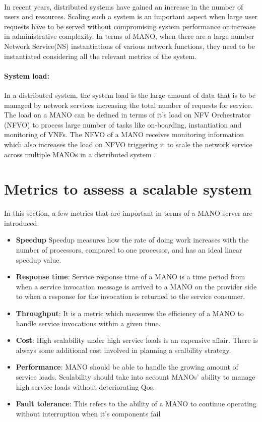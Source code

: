 \paragraph{}
In recent years, distributed systems have gained an increase in the number of users and resources. Scaling such a system is an important aspect when large user requests have to be served without compromising system performance or increase in administrative complexity. In terms of MANO, when there are a large number Network Service(NS) instantiations of various network functions, they need to be instantiated considering all the relevant metrics of the system.

\paragraph{System load:}
In a distributed system, the system load is the large amount of data that is to be managed by network services increasing the total number of requests for service.
The load on a MANO can be defined in terms of it's load on NFV Orchestrator (NFVO) to process large number of tasks like on-boarding, instantiation and monitoring of VNFs. The NFVO of a MANO receives monitoring information which also increases the load on NFVO triggering it to scale the network service across multiple MANOs in a distributed system \cite{soenen2017optimising}.


\section{Metrics to assess a scalable system}
\label{Metrics}
In this section, a few metrics that are important in terms of a MANO server are introduced.

\begin{itemize}
	\item \textbf{Speedup} Speedup measures how the  rate of doing work increases with the number of processors, compared to one processor, and has an ideal linear speedup value. \cite{jogalekar_evaluating_2000}
	\item  \textbf{Response time}: Service response time of a MANO is a time period from when a service invocation message is arrived to a MANO on the provider side to when a response for the invocation is returned to the service consumer.
	\item \textbf {Throughput}: It is a metric which measures the efficiency of a MANO to handle service invocations within a given time.
	\item \textbf{Cost}: High scalability under high service loads is an expensive affair. There is always some additional cost involved in planning a scalbility strategy.
	\item \textbf{Performance}: MANO should be able to handle the growing amount of service loads. Scalability should take into account MANOs' ability to manage high service loads without deteriorating Qos.
	\item \textbf{Fault tolerance}: This refers to the ability of a MANO to continue operating without interruption when it's components fail
\end{itemize}


